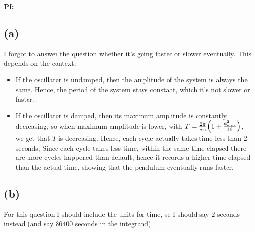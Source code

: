 \documentclass{article}
\DeclarePairedDelimiter{\paran}{(}{)}%
\begin{document}
\textbf{Pf:}
\subsection*{(a)}
I forgot to answer the question whether it's going faster or slower eventually. This depends on the context:
\begin{itemize}
    \item If the oscillator is undamped, then the amplitude of the system is always the same. Hence, the period of the system stays constant, which it's not slower or faster.
    \item If the oscillator is damped, then its maximum amplitude is constantly decreasing, so when maximum amplitude is lower, with $T=\frac{2\pi}{w_0}\paran*{1+\frac{\phi_{\max}^2}{16}}$, we get that $T$ is decreasing. Hence, each cycle actually takes time less than $2$ seconds; Since each cycle takes less time, within the same time elapsed there are more cycles happened than default, hence it records a higher time elapsed than the actual time, showing that the pendulum eventually runs faster.
\end{itemize}
\subsection*{(b)}
For this question I should include the units for time, so I should say $2$ seconds instead (and say $86400$ seconds in the integrand).
\end{document}
